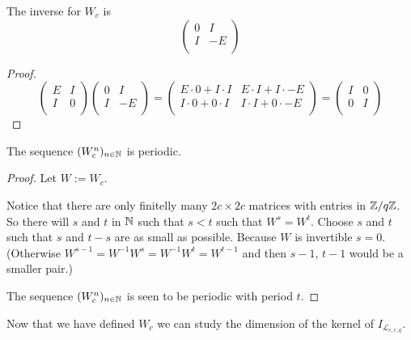 \begin{lemma}\label{lemma:Winverse}
	The inverse for $W_{c}$ is
	\[
 		\left(
		\begin{array}{cc}
			0 & I  \\
			I & -E \\
		\end{array}
		\right)
	\]
\end{lemma}

\begin{proof}
	\[
 		\left(
		\begin{array}{cc}
			E & I \\
			I & 0 \\
		\end{array}
		\right)		
 		\left(
		\begin{array}{cc}
			0 & I  \\
			I & -E \\
		\end{array}
		\right)
		=
 		\left(
		\begin{array}{cc}
			E \cdot 0 + I \cdot I & E \cdot I + I \cdot -E \\
			I \cdot 0 + 0 \cdot I & I \cdot I + 0 \cdot -E \\
		\end{array}
		\right)
		=
 		\left(
		\begin{array}{cc}
			I & 0 \\
			0 & I \\
		\end{array}
		\right)		
	\]
\end{proof}

\begin{corollary}\label{corollary:Wperiodic}
	The sequence $(W_{c}^{n})_{n\in\mathbb{N}}$ is periodic.
\end{corollary}

\begin{proof}
	Let $W := W_{c}$.
	
	Notice that there are only finitelly many $2c \times 2c$ matrices with
	entries in $\mathbb{Z}/q\mathbb{Z}$. So there will $s$ and $t$ in $\mathbb{N}$ such that $s<t$
	such that $W^{s} = W^{t}$. Choose $s$ and $t$ such that $s$ and $t-s$
	are as small as possible. Because $W$ is invertible $s=0$. (Otherwise
	$W^{s-1} = W^{-1} W^{s} = W^{-1} W^{t} = W^{t-1}$ and then $s-1$, $t-1$
	would be a smaller pair.)
	
	The sequence $(W_{c}^{n})_{n\in\mathbb{N}}$ is seen to be periodic with period
	$t$.
\end{proof}

Now that we have defined $W_{c}$ we can study the dimension of the kernel of
$I_{\mathcal{L}_{c,r,q}}$.


